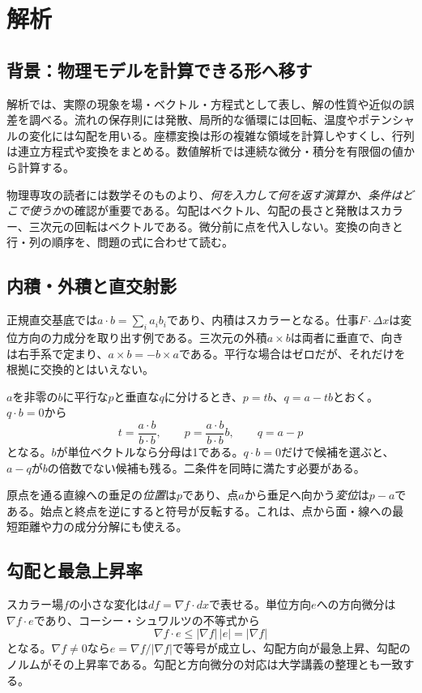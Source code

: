 \chapter{解析}
\section{背景：物理モデルを計算できる形へ移す}
解析では、実際の現象を場・ベクトル・方程式として表し、解の性質や近似の誤差を調べる。流れの保存則には発散、局所的な循環には回転、温度やポテンシャルの変化には勾配を用いる。座標変換は形の複雑な領域を計算しやすくし、行列は連立方程式や変換をまとめる。数値解析では連続な微分・積分を有限個の値から計算する。

物理専攻の読者には数学そのものより、\emph{何を入力して何を返す演算か、条件はどこで使うか}の確認が重要である。勾配はベクトル、勾配の長さと発散はスカラー、三次元の回転はベクトルである。微分前に点を代入しない。変換の向きと行・列の順序を、問題の式に合わせて読む。

\section{内積・外積と直交射影}
\label{theory:analysis:projection}
正規直交基底では$a\cdot b=\sum_i a_i b_i$であり、内積はスカラーとなる。仕事$F\cdot\Delta x$は変位方向の力成分を取り出す例である。三次元の外積$a\times b$は両者に垂直で、向きは右手系で定まり、$a\times b=-b\times a$である。平行な場合はゼロだが、それだけを根拠に交換的とはいえない。

$a$を非零の$b$に平行な$p$と垂直な$q$に分けるとき、$p=tb$、$q=a-tb$とおく。$q\cdot b=0$から
\[
 t=\frac{a\cdot b}{b\cdot b},\qquad
 p=\frac{a\cdot b}{b\cdot b}b,\qquad q=a-p
\]
となる。$b$が単位ベクトルなら分母は1である。$q\cdot b=0$だけで候補を選ぶと、$a-q$が$b$の倍数でない候補も残る。二条件を同時に満たす必要がある。

原点を通る直線への垂足の\emph{位置}は$p$であり、点$a$から垂足へ向かう\emph{変位}は$p-a$である。始点と終点を逆にすると符号が反転する。これは、点から面・線への最短距離や力の成分分解にも使える。

\section{勾配と最急上昇率}
\label{theory:analysis:gradient}
スカラー場$f$の小さな変化は$df=\nabla f\cdot dx$で表せる。単位方向$e$への方向微分は$\nabla f\cdot e$であり、コーシー・シュワルツの不等式から
\[
 \nabla f\cdot e\le |\nabla f|\,|e|=|\nabla f|
\]
となる。$\nabla f\neq0$なら$e=\nabla f/|\nabla f|$で等号が成立し、勾配方向が最急上昇、勾配のノルムがその上昇率である。勾配と方向微分の対応は大学講義の整理とも一致する\parencite{mit_chain2007}。

